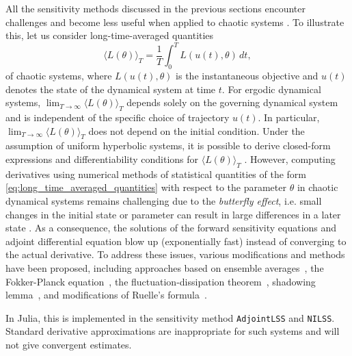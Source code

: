 All the sensitivity methods discussed in the previous sections encounter challenges and become less useful when applied to chaotic systems \cite{Wang2012-chaos-adjoint}.
To illustrate this, let us consider long-time-averaged quantities 
\begin{equation}\label{eq:long_time_averaged_quantities}
    \langle L(\theta) \rangle_T = \frac{1}{T} \int_0^T L(u(t), \theta) \, dt, 
\end{equation}
of chaotic systems, where $L(u(t), \theta)$ is the instantaneous objective and $u(t)$ denotes the state of the dynamical system at time $t$.
For ergodic dynamical systems, $\lim_{T\to\infty} \langle L(\theta) \rangle_T$ depends solely on the governing dynamical system and is independent of the specific choice of trajectory $u(t)$. 
In particular, $\lim_{T\to\infty} \langle L(\theta) \rangle_T$ does not depend on the initial condition. 
Under the assumption of uniform hyperbolic systems, it is possible to derive closed-form expressions and differentiability conditions for $ \langle L(\theta) \rangle_T$ \cite{ruelle1997differentiation,ruelle2009review}.
However, computing derivatives using numerical methods of statistical quantities of the form \eqref{eq:long_time_averaged_quantities} with respect to the parameter $\theta$ in chaotic dynamical systems remains challenging due to the \textit{butterfly effect}, i.e. small changes in the initial state or parameter can result in large differences in a later state \cite{Lorenz.1963}.
As a consequence, the solutions of the forward sensitivity equations and adjoint differential equation blow up (exponentially fast) instead of converging to the actual derivative.
To address these issues, various modifications and methods have been proposed, including approaches based on ensemble averages~\cite{lea2000sensitivity, eyink2004ruelle}, the Fokker-Planck equation~\cite{thuburn2005climate, blonigan2014probability}, the fluctuation-dissipation theorem~\cite{leith1975climate, abramov2007blended, abramov2008new}, shadowing lemma~\cite{wang2013forward, wang2014least, wang2014convergence, ni2017sensitivity, blonigan2017adjoint, blonigan2018multiple, ni2019adjoint, ni2019sensitivity}, and modifications of Ruelle's formula~\cite{chandramoorthy2022efficient, ni2020fast}.

In Julia, this is implemented in the sensitivity method \texttt{AdjointLSS} and \texttt{NILSS}. %
Standard derivative approximations are inappropriate for such systems and will not give convergent estimates.

